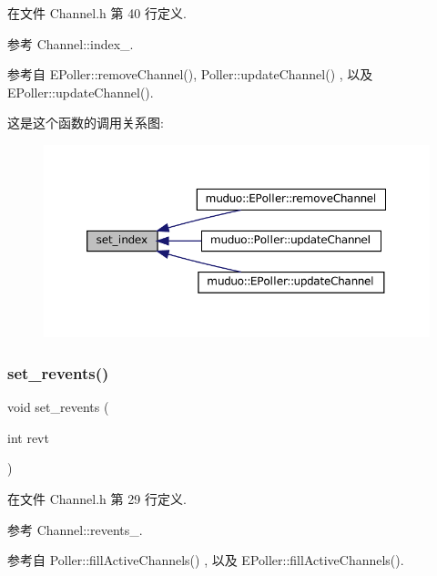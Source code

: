 在文件 Channel.\+h 第 40 行定义.



参考 Channel\+::index\+\_\+.



参考自 E\+Poller\+::remove\+Channel(), Poller\+::update\+Channel() , 以及 E\+Poller\+::update\+Channel().

这是这个函数的调用关系图\+:
\nopagebreak
\begin{figure}[H]
\begin{center}
\leavevmode
\includegraphics[width=350pt]{classmuduo_1_1Channel_ac9a4cd0efc3148a6fee45b2ab4f61cb6_icgraph}
\end{center}
\end{figure}
\mbox{\label{classmuduo_1_1Channel_ac155f87f8dc6f7bdf9559d4d2e5a9a4b}} 
\subsubsection{\texorpdfstring{set\+\_\+revents()}{set\_revents()}}
{\footnotesize\ttfamily void set\+\_\+revents (\begin{DoxyParamCaption}\item[{int}]{revt }\end{DoxyParamCaption})\hspace{0.3cm}{\ttfamily [inline]}}



在文件 Channel.\+h 第 29 行定义.



参考 Channel\+::revents\+\_\+.



参考自 Poller\+::fill\+Active\+Channels() , 以及 E\+Poller\+::fill\+Active\+Channels().

